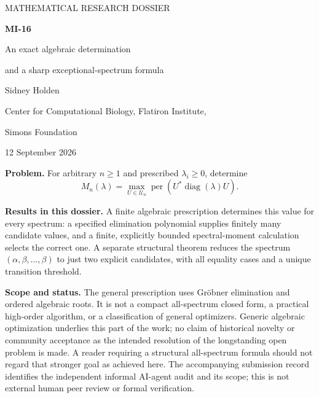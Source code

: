 \documentclass[11pt]{article}
\newcommand{\per}{\operatorname{per}}
\newcommand{\diag}{\operatorname{diag}}
\newcommand{\U}{\mathcal U}
\theoremstyle{definition}\newtheorem{definition}[theorem]{Definition}
\theoremstyle{remark}\newtheorem{remark}[theorem]{Remark}
\begin{document}
\begin{titlepage}
\vspace*{0mm}
{\small\sffamily MATHEMATICAL RESEARCH DOSSIER\par}
\vspace{7mm}
{\LARGE\bfseries MI-16\par}
\vspace{3mm}
{\Large An exact algebraic determination\par}
{\Large and a sharp exceptional-spectrum formula\par}
\vspace{4mm}
{\large Sidney Holden\par}
\vspace{2mm}
{\small Center for Computational Biology, Flatiron Institute,\par}
{\small Simons Foundation\par}
\vspace{3mm}
{\large 12 September 2026\par}
\vspace{3mm}
\textbf{Problem.} For arbitrary $n\geq1$ and prescribed $\lambda_i\geq0$, determine
\[
 M_n(\lambda)=\max_{U\in\U_n}\per\!\left(U^*\diag(\lambda)U\right).
\]
\par\vspace{4mm}
\textbf{Results in this dossier.} A finite algebraic prescription determines this value for every spectrum: a specified elimination polynomial supplies finitely many candidate values, and a finite, explicitly bounded spectral-moment calculation selects the correct one. A separate structural theorem reduces the spectrum $(\alpha,\beta,\ldots,\beta)$ to just two explicit candidates, with all equality cases and a unique transition threshold.
\par\vspace{4mm}
\textbf{Scope and status.} The general prescription uses Gr\"obner elimination and ordered algebraic roots. It is not a compact all-spectrum closed form, a practical high-order algorithm, or a classification of general optimizers. Generic algebraic optimization underlies this part of the work; no claim of historical novelty or community acceptance as the intended resolution of the longstanding open problem is made. A reader requiring a structural all-spectrum formula should not regard that stronger goal as achieved here. The accompanying submission record identifies the independent informal AI-agent audit and its scope; this is not external human peer review or formal verification.
\par\vspace{4mm}

\end{titlepage}
\end{document}

